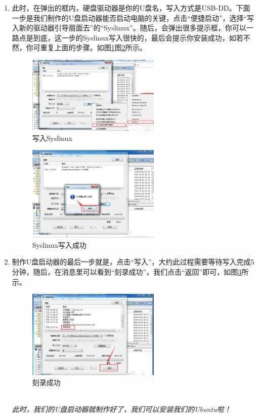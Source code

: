 \documentclass{article}
\begin{document}
\begin{enumerate}
\item 此时，在弹出的框内，硬盘驱动器是你的U盘名，写入方式是USB-DD。下面一步是我们制作的U盘启动器能否启动电脑的关键，点击“便捷启动”，选择“写入新的驱动器引导扇面去”的“Syslinux”。随后，会弹出很多提示框，你可以一路点是到底，这一步的Syslinux写入很快的，最后会提示你安装成功，如若不然，你可重复上面的步骤。如图\ref{tu2}图\ref{tu3}所示。
\begin{figure}[!htb] %
\centering
\includegraphics[width=0.6\textwidth]{tu2.jpeg}
\caption{\small 写入Syslinux}
\label{tu2}
\end{figure}  

\begin{figure}[!htb] %
\centering
\includegraphics[width=0.6\textwidth]{tu3.jpeg}
\caption{\small Syslinux写入成功}
\label{tu3}
\end{figure}  
\item 制作U盘启动器的最后一步就是，点击“写入”，大约此过程需要等待写入完成5分钟，随后，在消息里可以看到“刻录成功”，我们点击“返回”即可，如图\ref{tu5}所示。
\begin{figure}[!htb] %
\centering
\includegraphics[width=0.6\textwidth]{tu5.jpeg}
\caption{\small 刻录成功}
\label{tu5}
\end{figure}\\ 
\textsl{此时，我们的U盘启动器就制作好了，我们可以安装我们的Ubuntu啦！}
\end{enumerate}
\end{document}
